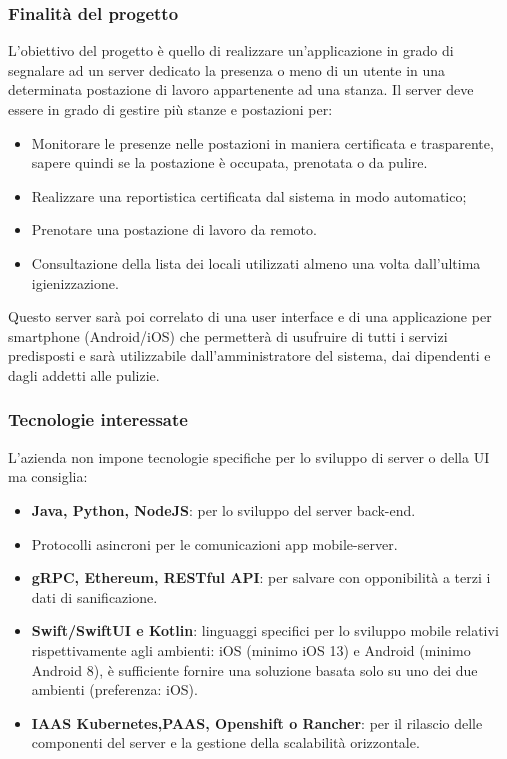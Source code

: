 		\subsubsection{Finalità del progetto}
			L’obiettivo del progetto è quello di realizzare un’applicazione in grado di segnalare ad un server dedicato la presenza o meno di un utente in una determinata postazione di lavoro appartenente ad una stanza.
			Il server deve essere in grado di gestire più stanze e postazioni per:
			\begin{itemize}
				\item Monitorare le presenze nelle postazioni in maniera certificata e trasparente, sapere quindi se la postazione è occupata, prenotata o da pulire.
				\item Realizzare una reportistica certificata dal sistema in modo automatico;
				\item Prenotare una postazione di lavoro da remoto.
				\item Consultazione della lista dei locali utilizzati almeno una volta dall’ultima igienizzazione.
			\end{itemize}
			Questo server sarà poi correlato di una user interface e di una applicazione per smartphone (Android/iOS) che permetterà di usufruire di tutti i servizi predisposti e sarà utilizzabile dall’amministratore del sistema, dai dipendenti e dagli addetti alle pulizie.
		
		\subsubsection{Tecnologie interessate}
			L’azienda non impone tecnologie specifiche per lo sviluppo di server o della UI ma consiglia:
			\begin{itemize}
				\item\textbf{Java, Python, NodeJS}: per lo sviluppo del server back-end.
				\item Protocolli asincroni per le comunicazioni app mobile-server.
				\item\textbf{gRPC, Ethereum, RESTful API}: per salvare con opponibilità a terzi i dati di sanificazione.
				\item\textbf{Swift/SwiftUI e Kotlin}:  linguaggi specifici per lo sviluppo mobile relativi rispettivamente agli ambienti: iOS (minimo iOS 13) e Android (minimo Android 8), è sufficiente fornire una soluzione basata solo su uno dei due ambienti (preferenza: iOS).
				\item\textbf{IAAS Kubernetes,PAAS, Openshift o Rancher}: per il rilascio delle componenti del server e la gestione della scalabilità orizzontale.
			\end{itemize}
			
